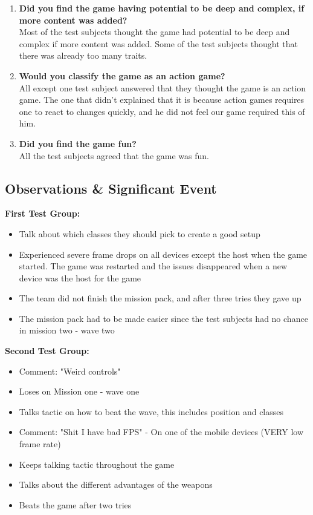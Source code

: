 \begin{enumerate}
\item \textbf{Did you find the game having potential to be deep and complex, if more content was added?}\vspace{4pt}\\
Most of the test subjects thought the game had potential to be deep and complex if more content was added.
Some of the test subjects thought that there was already too many traits.

\item \textbf{Would you classify the game as an action game?}\vspace{4pt}\\
All except one test subject answered that they thought the game is an action game.
The one that didn't explained that it is because action games requires one to react to changes quickly, and he did not feel our game required this of him.

\item \textbf{Did you find the game fun?}\vspace{4pt}\\
All the test subjects agreed that the game was fun.
\end{enumerate}

\subsection{Observations \& Significant Event}
\textbf{First Test Group:}\\
\begin{itemize}
\item Talk about which classes they should pick to create a good setup
\item Experienced severe frame drops on all devices except the host when the game started. The game was restarted and the issues disappeared when a new device was the host for the game
\item The team did not finish the mission pack, and after three tries they gave up
\item The mission pack had to be made easier since the test subjects had no chance in mission two - wave two
\end{itemize}

\textbf{Second Test Group:}\\
\begin{itemize}
\item Comment: "Weird controls"
\item Loses on Mission one - wave one
\item Talks tactic on how to beat the wave, this includes position and classes
\item Comment: "Shit I have bad FPS" - On one of the mobile devices (VERY low frame rate)
\item Keeps talking tactic throughout the game
\item Talks about the different advantages of the weapons
\item Beats the game after two tries
\end{itemize}

